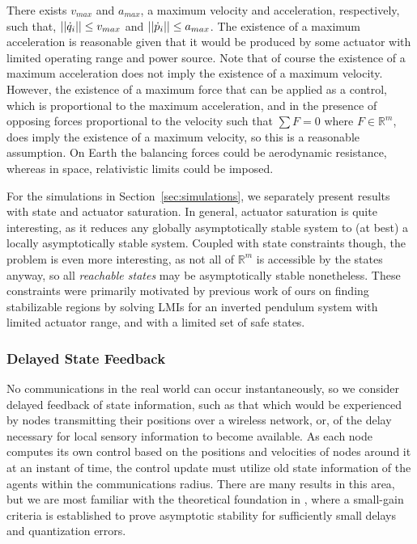 \documentclass[10pt, conference]{IEEEtran}
\begin{document}
There exists $v_{max}$ and $a_{max}$, a maximum velocity and acceleration, respectively, such that, $\lvert\lvert\dot{q}_{i}\rvert\rvert \leq v_{max}$ and $\lvert\lvert\dot{p}_{i}\rvert\rvert \leq a_{max}$.
%
The existence of a maximum acceleration is reasonable given that it would be produced by some actuator with limited operating range and power source.
%
Note that of course the existence of a maximum acceleration does not imply the existence of a maximum velocity.
%
However, the existence of a maximum force that can be applied as a control, which is proportional to the maximum acceleration, and in the presence of opposing forces proportional to the velocity such that $\sum{F}=0$ where $F \in \mathbb{R}^m$, does imply the existence of a maximum velocity, so this is a reasonable assumption.
%
On Earth the balancing forces could be aerodynamic resistance, whereas in space, relativistic limits could be imposed.

For the simulations in Section~\ref{sec:simulations}, we separately present results with state and actuator saturation.
%
In general, actuator saturation is quite interesting, as it reduces any globally asymptotically stable system to (at best) a locally asymptotically stable system.
%
Coupled with state constraints though, the problem is even more interesting, as not all of $\mathbb{R}^m$ is accessible by the states anyway, so all \textit{reachable states} may be asymptotically stable nonetheless.
%
These constraints were primarily motivated by previous work of ours on finding stabilizable regions by solving LMIs for an inverted pendulum system with limited actuator range, and with a limited set of safe states.

\subsubsection{Delayed State Feedback}

No communications in the real world can occur instantaneously, so we consider delayed feedback of state information, such as that which would be experienced by nodes transmitting their positions over a wireless network, or, of the delay necessary for local sensory information to become available.
%
As each node computes its own control based on the positions and velocities of nodes around it at an instant of time, the control update must utilize old state information of the agents within the communications radius.
%
There are many results in this area, but we are most familiar with the theoretical foundation in \cite{LiberzonQuantDelay2006}, where a small-gain criteria is established to prove asymptotic stability for sufficiently small delays and quantization errors.
\end{document}

